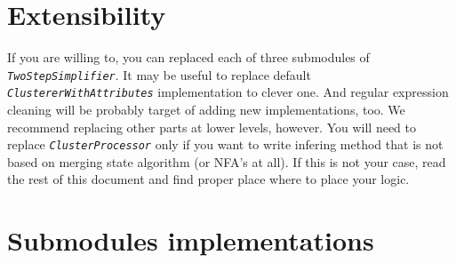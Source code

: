 \documentclass[a4paper,10pt,oneside]{article}
\newcommand{\jmodule}[1]{\texttt{\textit{#1}}}
\begin{document}
\section{Extensibility}
If you are willing to, you can replaced each of three submodules of \jmodule{TwoStepSimplifier}.
It may be useful to replace default \jmodule{ClustererWithAttributes} implementation to clever one.
And regular expression cleaning will be probably target of adding new implementations, too.
We recommend replacing other parts at lower levels, however.
You will need to replace \jmodule{ClusterProcessor} only if you want to write infering method that is not based on merging state algorithm (or NFA's at all).
If this is not your case, read the rest of this document and find proper place where to place your logic.

\section{Submodules implementations}
\end{document}
